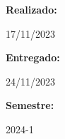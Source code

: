 \documentclass[a4paper]{article}
\begin{document}
\begin{titlepage}
        \raggedright{\huge\textbf{Realizado:}}
        \par\vspace{0.5cm}
        \centering
        {\huge{17/11/2023}}
        \par\vspace{0.5cm}

        \raggedright{\huge\textbf{Entregado:}}
        \par\vspace{0.5cm}
        \centering
        {\huge{24/11/2023}}
        \par\vspace{0.5cm}

        \raggedright{\huge\textbf{Semestre:}}
        \par\vspace{0.5cm}
        \centering
        {\huge{2024-1}}
        \par\vspace{0.5cm}

        \vfill

    \end{titlepage}
    
\end{document}
